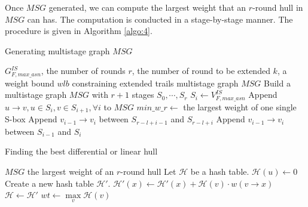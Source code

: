 Once $MSG$ generated, we can compute the largest weight that an $r$-round hull in $MSG$ can has. The computation is conducted in a stage-by-stage manner. The procedure is given in Algorithm \ref{algo:4}.

\begin{algorithm}
	\caption{Generating multistage graph $MSG$}
	\label{algo:3}
	\begin{algorithmic}[1]
		\Require $G^{IS}_{F,max\_asn}$, the number of rounds $r$, the number of round to be extended $k$, a weight bound $wlb$ constraining extended trails
		\Ensure multistage graph $MSG$
		\Procedure {}{}
		\State Build a multistage graph $MSG$ with $r+1$ stages $S_0,\cdots,S_r$
		\State $S_i\leftarrow V^{IS}_{F,max\_asn}$
		\EndFor
		\State Append $u\rightarrow v, u\in S_i,v\in S_{i+1}, \forall i$ to $MSG$
		\EndFor
		\State $min\_w\_r\leftarrow$ the largest weight of one single S-box
		\State Append $v_{i-1}\rightarrow v_i$ between $S_{r-l+i-1}$ and $S_{r-l+i}$
		\EndFor
		\State Append $v_{i-1}\rightarrow v_i$ between $S_{i-1}$ and $S_{i}$
		\EndFor
		\EndIf
		\EndFor
		\EndProcedure
	\end{algorithmic}
\end{algorithm}

\begin{algorithm}
	\caption{Finding the best differential or linear hull}
	\label{algo:4}
	\begin{algorithmic}[1]
		\Require $MSG$
		\Ensure the largest weight of an $r$-round hull
		\Procedure {}{}
		\State Let $\mathcal{H}$ be a hash table. 
		\State $\mathcal{H}(u)\leftarrow 0$
		\State Create a new hash table $\mathcal{H}'$. 
		\State $\mathcal{H}'(x)\leftarrow \mathcal{H}'(x)+\mathcal{H}(v)\cdot w(v\rightarrow x)$
		\EndFor
		\EndFor
		\State $\mathcal{H}\leftarrow \mathcal{H}'$
		\EndFor
		\State $wt\leftarrow \max\limits_{v}\mathcal{H}(v)$
		\EndIf
		\EndFor
		\State {}
		\EndProcedure
	\end{algorithmic}
\end{algorithm}



